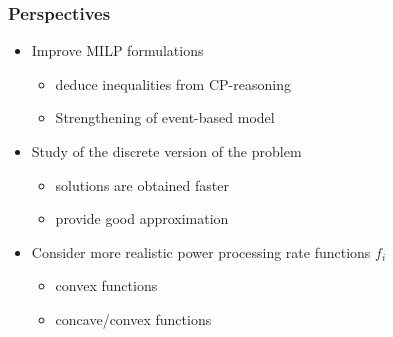 \documentclass{beamer}
\begin{document}
  \begin{frame}
    \frametitle{Perspectives}
    \vfill
    \begin{itemize}
    \item Improve MILP formulations
      \pause
      \begin{itemize}
      \item deduce inequalities from CP-reasoning
      \item Strengthening of event-based model
      \end{itemize}
      \vfill
      \pause
    \item Study of the discrete version of the problem
      \begin{itemize}
        \pause
      \item solutions are obtained faster  
      \item provide good approximation
      \end{itemize}
      \vfill
      \pause
    \item Consider more realistic power processing rate functions
      $f_i$
      \begin{itemize}
        \pause
      \item convex functions
      \item concave/convex functions
      \end{itemize}
    \end{itemize}
    \vfill
  \end{frame}
\end{document}
